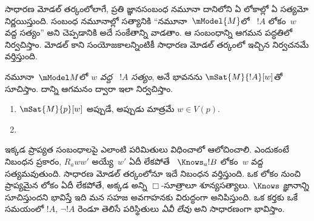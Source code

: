 \documentclass[../../../include/open-logic-section]{subfiles}
\begin{document}


సాధారణ మోడల్ తర్కంలోలాగే, ప్రతి జ్ఞానసంబంధ నమూనా
దానిలోని ఏ లోకాల్లో ఏ 
సత్యమో నిర్ణయిస్తుంది. సంబంధ నమూనాల్లో సత్యానికి ``నమూనా~$\mModel{M}$లో
~$!A$ లోకం~$w$ వద్ద సత్యం''
అని చెప్పడానికి అదే సంకేతాన్ని వాడతాం. ఆ సంబంధాన్ని ఆగమన
పద్ధతిలో నిర్వచిస్తాం. మోడల్ కాని సంయోజకాలన్నింటికీ సాధారణ
మోడల్ తర్కంలో ఇచ్చిన నిర్వచనమే వర్తిస్తుంది.

\begin{defn}
  నమూనా~$\mModel M$లో \emph{$w$ వద్ద
  ~$!A$ సత్యం},
  అనే భావనను $\mSat{M}{!A}[w]$తో సూచిస్తాం.
  దాన్ని ఆగమనం ద్వారా ఇలా నిర్వచిస్తాం.
  \begin{enumerate}
  \item $\mSat{M}{p}[w]$ అప్పుడే, అప్పుడు మాత్రమే $w \in V(p)$.
  \item{}
  \end{enumerate}
\end{defn}

ఇక్కడ ప్రాప్యత సంబంధాలపై ఎలాంటి పరిమితులు విధించాలో ఆలోచించాలి.
ఎందుకంటే  నిబంధన ప్రకారం,
$R_a ww'$ అయ్యే~$w'$ ఏదీ లేకపోతే
~$\Knows_a !B$
లోకం~$w$ వద్ద సత్యమవుతుంది. సాధారణ మోడల్ తర్కంలోనూ
ఇదే నిబంధన వర్తిస్తుంది. ఒక లోకం నుంచి ప్రాప్యమైన లోకం ఏదీ లేకపోతే,
అక్కడ అన్ని $\Box$-సూత్రాలూ శూన్యసత్యాలు.
$\Knows$ \emph{జ్ఞానాన్ని} సూచిస్తుందని భావిస్తే ఇది
మన సహజ అవగాహనకు విరుద్ధంగా అనిపిస్తుంది. ఒక కర్తకు ఒకే సమయంలో
$!A$, $\lnot !A$ రెండూ తెలిసే పరిస్థితులు
\emph{ఏవీ లేవు} అని సాధారణంగా భావిస్తాం.
\end{document}
